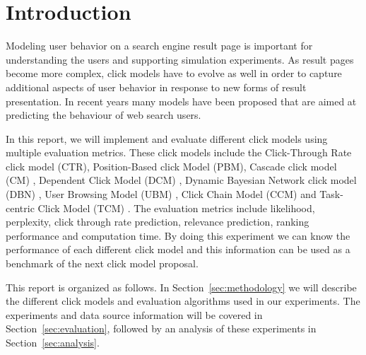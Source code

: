 \section{Introduction}
Modeling user behavior on a search engine result page is important for understanding the users and supporting simulation experiments.
As result pages become more complex, click models have to evolve as well in order to capture additional aspects of user behavior in response to new forms of result presentation.
In recent years many models have been proposed that are aimed at predicting the behaviour of web search users. 

In this report, we will implement and evaluate different click models using multiple evaluation metrics.
These click models include the Click-Through Rate click model (CTR), Position-Based click Model (PBM), Cascade click model (CM) \cite{Kempe2008}, Dependent Click Model (DCM) \cite{Guo2009_DCM}, Dynamic Bayesian Network click model (DBN) \cite{Chapelle2009}, User Browsing Model (UBM) \cite{Dupret2008}, Click Chain Model (CCM) \cite{Guo2009_CCM} and Task-centric Click Model (TCM) \cite{Zhang2011}.
The evaluation metrics include likelihood, perplexity, click through rate prediction, relevance prediction, ranking performance and computation time.
By doing this experiment we can know the performance of each different click model and this information can be used as a benchmark of the next click model proposal.

This report is organized as follows.
In Section~\ref{sec:methodology} we will describe the different click models and evaluation algorithms used in our experiments.
The experiments and data source information will be covered in Section~\ref{sec:evaluation}, followed by an analysis of these experiments in Section~\ref{sec:analysis}.
